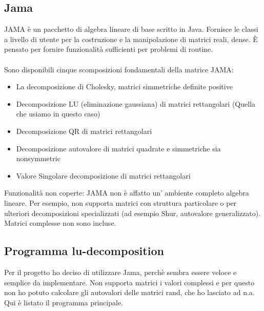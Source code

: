 \documentclass[12pt]{article}
\begin{document}
\subsection{Jama}
JAMA \`e un pacchetto di algebra lineare di base scritto in Java. Fornisce le classi a livello di utente per la costruzione e la manipolazione di matrici reali, dense. \`E pensato per fornire funzionalit\`a sufficienti per problemi di routine. \\
\\
Sono disponibili cinque scomposizioni fondamentali della matrice JAMA:
\begin{itemize}
\item La decomposizione di Cholesky, matrici simmetriche definite positive
\item Decomposizione LU (eliminazione gaussiana) di matrici rettangolari (Quella che usiamo in questo caso)
\item Decomposizione QR di matrici rettangolari
\item Decomposizione autovalore di matrici quadrate e simmetriche sia nonsymmetric
\item Valore Singolare decomposizione di matrici rettangolari
\end{itemize}
Funzionalit\`a non coperte: JAMA non \`e affatto un' ambiente completo algebra lineare. Per esempio, non supporta matrici con struttura particolare o per ulteriori decomposizioni specializzati (ad esempio Shur, autovalore generalizzato). Matrici complesse non sono incluse.

\subsection{Programma lu-decomposition}
Per il progetto ho deciso di utilizzare Jama, perch\`e sembra essere veloce e semplice da implementare. Non supporta matrici i valori complessi e per questo non ho potuto calcolare gli autovalori delle matrici rand, che ho lasciato ad n.a.\\
Qui \`e listato il programma principale.

\newpage

\newpage
\end{document}
